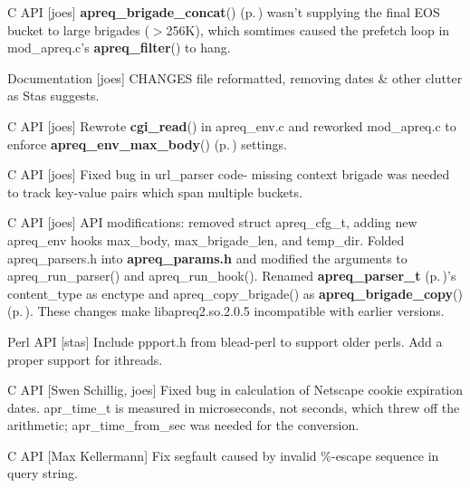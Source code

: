 \begin{CompactItemize}
\item 
C API [joes] {\bf apreq\_\-brigade\_\-concat}() {\rm (p.\,\pageref{group__params_a16})} wasn't supplying the final EOS bucket to large brigades ($>$256K), which somtimes caused the prefetch  loop in mod\_\-apreq.c's {\bf apreq\_\-filter}() to hang.\end{CompactItemize}
\begin{CompactItemize}
\item 
Documentation [joes] CHANGES file reformatted, removing dates \& other clutter  as Stas suggests.\end{CompactItemize}
\begin{CompactItemize}
\item 
C API [joes] Rewrote {\bf cgi\_\-read}() in apreq\_\-env.c and reworked mod\_\-apreq.c  to enforce {\bf apreq\_\-env\_\-max\_\-body}() {\rm (p.\,\pageref{group__ENV_a10})} settings.\end{CompactItemize}
\begin{CompactItemize}
\item 
C API [joes] Fixed bug in url\_\-parser code- missing context brigade was needed to track key-value pairs which span multiple buckets.\end{CompactItemize}
\begin{CompactItemize}
\item 
C API [joes] API modifications: removed struct apreq\_\-cfg\_\-t, adding new apreq\_\-env hooks max\_\-body, max\_\-brigade\_\-len, and temp\_\-dir. Folded apreq\_\-parsers.h into {\bf apreq\_\-params.h} and modified the arguments  to apreq\_\-run\_\-parser() and apreq\_\-run\_\-hook(). Renamed  {\bf apreq\_\-parser\_\-t} {\rm (p.\,\pageref{structapreq__parser__t})}'s content\_\-type as enctype and apreq\_\-copy\_\-brigade() as {\bf apreq\_\-brigade\_\-copy}() {\rm (p.\,\pageref{group__Utils_a22})}. These changes make libapreq2.so.2.0.5 incompatible with earlier  versions.\end{CompactItemize}
\begin{CompactItemize}
\item 
Perl API [stas] Include ppport.h from blead-perl to support older perls. Add a proper support for ithreads.\end{CompactItemize}
\begin{CompactItemize}
\item 
C API [Swen Schillig, joes] Fixed bug in calculation of Netscape cookie expiration dates. apr\_\-time\_\-t is measured in microseconds, not seconds, which threw off the arithmetic; apr\_\-time\_\-from\_\-sec was needed for the conversion.\end{CompactItemize}
\begin{CompactItemize}
\item 
C API [Max Kellermann] Fix segfault caused by invalid \%-escape sequence in query string.\end{CompactItemize}
